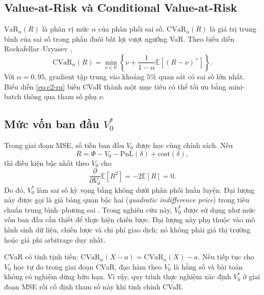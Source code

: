 \subsection{Value-at-Risk và Conditional Value-at-Risk}

$\mathrm{VaR}_{\alpha}(R)$ là phân vị mức $\alpha$ của phân phối sai số.
$\mathrm{CVaR}_{\alpha}(R)$ là giá trị trung bình của sai số trong phần đuôi
bất lợi vượt ngưỡng VaR. Theo biểu diễn Rockafellar--Uryasev
\parencite{Rockafellar2000},
\begin{equation}
    \mathrm{CVaR}_{\alpha}(R)
    =\min_{\nu\in\mathbb{R}}
    \left\{\nu+\frac{1}{1-\alpha}
    \mathbb{E}\left[(R-\nu)^{+}\right]\right\}.
    \label{eq:c2-ru}
\end{equation}
Với $\alpha=0{,}95$, gradient tập trung vào khoảng $5\%$ quan sát có sai số lớn
nhất. Biểu diễn \eqref{eq:c2-ru} biến CVaR thành một mục tiêu có thể tối ưu bằng
mini-batch thông qua tham số phụ $\nu$.

\subsection{Mức vốn ban đầu $V_0^{*}$}

Trong giai đoạn MSE, số tiền ban đầu $V_0$ được học cùng chính sách. Nếu
\begin{equation}
    R=\Phi-V_0-\mathrm{PnL}(\delta)+\mathrm{cost}(\delta),
\end{equation}
thì điều kiện bậc nhất theo $V_0$ cho
\begin{equation}
    \frac{\partial}{\partial V_0}\mathbb{E}[R^2]
    =-2\mathbb{E}[R]=0.
    \label{eq:c2-v0-foc}
\end{equation}
Do đó, $V_0^{*}$ làm sai số kỳ vọng bằng không dưới phân phối huấn luyện. Đại
lượng này được gọi là giá bàng quan bậc hai (\textit{quadratic indifference
price}) trong tiêu chuẩn trung bình--phương sai
\parencite{FollmerSondermann1986,Schweizer2010}. Trong nghiên cứu này,
$V_0^{*}$ được sử dụng như mức vốn ban đầu cần thiết để thực hiện chiến lược.
Đại lượng này phụ thuộc vào mô hình sinh dữ liệu, chiến lược và chi phí giao
dịch; nó không phải giá thị trường hoặc giá phi arbitrage duy nhất.

CVaR có tính tịnh tiến:
$\mathrm{CVaR}_{\alpha}(X-a)=\mathrm{CVaR}_{\alpha}(X)-a$. Nếu tiếp tục cho
$V_0$ học tự do trong giai đoạn CVaR, đạo hàm theo $V_0$ là hằng số và bài toán
không có nghiệm dừng hữu hạn. Vì vậy, quy trình thực nghiệm xác định $V_0^{*}$
ở giai đoạn MSE rồi cố định tham số này khi tinh chỉnh CVaR.

